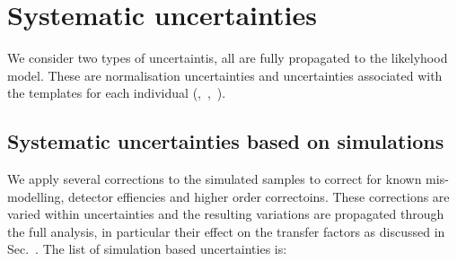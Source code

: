 \section{Systematic uncertainties}
\label{sec:systematics}

We consider two types of uncertaintis, all are fully propagated to the likelyhood model.
These are normalisation uncertainties and uncertainties associated with the \mht templates for each individual (\njet,~\nb,~\scalht).



\subsection{Systematic uncertainties based on simulations}


We apply several corrections to the simulated samples to correct for known mis-modelling, detector effiencies and higher order correctoins.
These corrections are varied within uncertainties and the resulting variations are propagated through the full analysis, in particular their effect
on the transfer factors as discussed in Sec.~. The list of simulation based uncertainties is:

